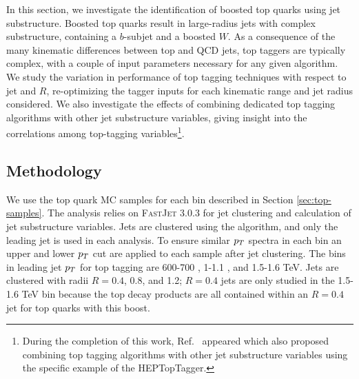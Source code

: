 In this section, we investigate the identification of boosted top quarks using jet substructure. Boosted top quarks result in large-radius jets with complex substructure, containing a $b$-subjet and a boosted $W$. As a consequence of the many kinematic differences between top and QCD jets, top taggers are typically complex, with a couple of input parameters necessary for any given algorithm. We study the variation in performance of top tagging techniques with respect to jet \pt and $R$, re-optimizing the tagger inputs for each kinematic range and jet radius considered. We also investigate the effects of combining dedicated top tagging algorithms with other jet substructure variables, giving insight into the correlations among top-tagging variables\footnote{During the completion of this work, Ref.~\cite{Kasieczka:2015jma} appeared which also proposed combining top tagging algorithms with other jet substructure variables using the specific example of the HEPTopTagger.}. 

\subsection{Methodology}\label{sec:topmethod}

We use the top quark MC samples for each bin described in Section \ref{sec:top-samples}. The analysis  relies on \textsc{FastJet} 3.0.3 for jet clustering and
calculation of jet substructure variables. Jets are clustered using the \antikt algorithm, and only the leading jet is used in each analysis. To ensure similar $p_T$ spectra in each bin an upper and lower $p_T$ cut are applied to each sample after jet clustering. The bins in leading jet $p_T$
 for top tagging are 600-700 \GeV, 1-1.1 \TeV, and
1.5-1.6 TeV. Jets are clustered with radii $R=0.4$, 0.8, and 1.2; $R=0.4$ jets are only studied in the 1.5-1.6 TeV bin
because the top decay products are all contained within an $R=0.4$ jet for top quarks with this boost.

